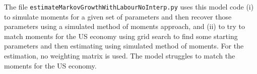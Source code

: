 The file \texttt{estimateMarkovGrowthWithLabourNoInterp.py} uses this model code (i) to simulate moments for a given set of parameters and then recover those parameters using a simulated method of moments approach, and (ii) to try to match moments for the US economy using grid search to find some starting parameters and then estimating using simulated method of moments. For the estimation, no weighting matrix is used. The model struggles to match the moments for the US economy.

